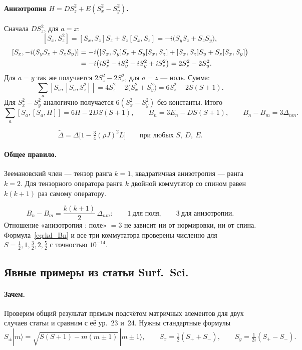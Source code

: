 \paragraph{Анизотропия $H=DS_z^2+E(S_x^2-S_y^2)$.} Сначала $DS_z^2$, для $a=x$:
\[
[S_x,S_z^2]=[S_x,S_z]S_z+S_z[S_x,S_z]=-i\big(S_yS_z+S_zS_y\big),
\]
\[
\begin{aligned}
\relax[S_x,-i(S_yS_z+S_zS_y)]
&=-i\big([S_x,S_y]S_z+S_y[S_x,S_z]+[S_x,S_z]S_y+S_z[S_x,S_y]\big)\\
&=-i\big(iS_z^2-iS_y^2-iS_y^2+iS_z^2\big)=2S_z^2-2S_y^2 .
\end{aligned}
\]
Для $a=y$ так же получается $2S_z^2-2S_x^2$, для $a=z$ --- ноль. Сумма:
\[
\sum_a[S_a,[S_a,S_z^2]]=4S_z^2-2\big(S_x^2+S_y^2\big)=6S_z^2-2S(S+1).
\]
Для $S_x^2-S_y^2$ аналогично получается $6(S_x^2-S_y^2)$ без константы. Итого
\[
\sum_a[S_a,[S_a,H]]=6H-2DS(S+1),\qquad B_n=3E_n-DS(S+1),\qquad B_n-B_m=3\Delta_{nm}.
\]
\begin{resbox}
\begin{equation}
\tilde\Delta=\Delta\Big[1-\tfrac34(\rho J)^2L\Big]\qquad\text{при любых } S,\ D,\ E .
\label{eq:kd_shift34}
\end{equation}
\end{resbox}

\paragraph{Общее правило.} Зеемановский член --- тензор ранга $k=1$,
квадратичная анизотропия --- ранга $k=2$. Для тензорного оператора ранга $k$
двойной коммутатор со спином равен $k(k+1)$ раз самому оператору.
\begin{resbox}
\[
B_n-B_m=\frac{k(k+1)}{2}\,\Delta_{nm}:\qquad 1\ \text{для поля},\qquad 3\ \text{для анизотропии}.
\]
Отношение «анизотропия : поле» $=3$ не зависит ни от нормировки, ни от спина.
Формула~\eqref{eq:kd_Bn} и все три коммутатора проверены численно для
$S=\tfrac12,1,\tfrac32,2,\tfrac52$ с точностью $10^{-14}$.
\end{resbox}

\subsection{Явные примеры из статьи Surf.\ Sci.}
\label{sec:kd_examples}

\paragraph{Зачем.} Проверим общий результат прямым подсчётом матричных
элементов для двух случаев статьи и сравним с её ур.~23 и~24. Нужны
стандартные формулы
\[
S_\pm|m\rangle=\sqrt{S(S+1)-m(m\pm1)}\,|m\pm1\rangle,\qquad S_x=\tfrac12(S_++S_-),\qquad
S_y=\tfrac1{2i}(S_+-S_-).
\]

